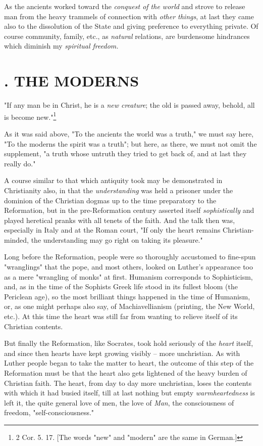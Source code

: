 \documentclass[a4paper]{book}
\begin{document}
As the ancients worked toward the \textit{conquest of the world} and strove to 
release man from the heavy trammels of connection with \textit{other things}, 
at last they came also to the dissolution of the State and giving preference 
to everything private. Of course community, family, etc., as \textit{natural} 
relations, are burdensome hindrances which diminish my \textit{spiritual 
freedom.}

\medskip{}

\section[2. The Moderns]{. THE MODERNS}

"{}If any man be in Christ, he is a \textit{new creature}; the old is passed 
away, behold, all is become new."{}\footnote{2 Cor. 5. 17. [The words 
"{}new"{} and "{}modern"{} are the same in German.]}

As it was said above, "{}To the ancients the world was a truth,"{} we must say 
here, "{}To the moderns the spirit was a truth"{}; but here, as there, we must 
not omit the supplement, "{}a truth whose untruth they tried to get back of, 
and at last they really do."{}

A course similar to that which antiquity took may be demonstrated in 
Christianity also, in that the \textit{understanding} was held a prisoner 
under the dominion of the Christian dogmas up to the time preparatory to the 
Reformation, but in the pre-Reformation century asserted itself 
\textit{sophistically} and played heretical pranks with all tenets of the 
faith. And the talk then was, especially in Italy and at the Roman court, 
"{}If only the heart remains Christian-minded, the understanding may go right 
on taking its pleasure."{}

Long before the Reformation, people were so thoroughly accustomed to fine-spun 
"{}wranglings"{} that the pope, and most others, looked on Luther's appearance 
too as a mere "{}wrangling of monks"{} at first. Humanism corresponds to 
Sophisticism, and, as in the time of the Sophists Greek life stood in its 
fullest bloom (the Periclean age), so the most brilliant things happened in 
the time of Humanism, or, as one might perhaps also say, of Machiavellianism 
(printing, the New World, etc.). At this time the heart was still far from 
wanting to relieve itself of its Christian contents.

But finally the Reformation, like Socrates, took hold seriously of the 
\textit{heart} itself, and since then hearts have kept growing visibly -- more 
unchristian. As with Luther people began to take the matter to heart, the 
outcome of this step of the Reformation must be that the heart also gets 
lightened of the heavy burden of Christian faith. The heart, from day to day 
more unchristian, loses the contents with which it had busied itself, till at 
last nothing but empty \textit{warmheartedness} is left it, the quite general 
love of men, the love of \textit{Man}, the consciousness of freedom, 
"{}self-consciousness."{}
\end{document}
